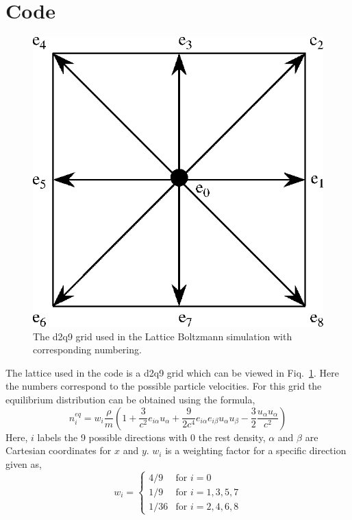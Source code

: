 \documentclass[8pt,twocolumn]{article}
\begin{document}
\section*{Code}
\begin{figure}[!b]
\centering
\includegraphics[width=0.8\linewidth]{images/d2q9.png}
\caption{The d2q9 grid used in the Lattice Boltzmann simulation with corresponding numbering.}
\label{fig:d2q9}
\end{figure}
The lattice used in the code is a d2q9 grid which can be viewed in Fiq.~\ref{fig:d2q9}. Here the numbers correspond to the possible particle velocities. For this grid the equilibrium distribution can be obtained using the formula,
\begin{equation}
n^{eq}_i = w_i \frac{\rho}{m} \left(1 + \frac{3}{c^2} e_{i\alpha}u_{\alpha} + \frac{9}{2c^4} e_{i\alpha}e_{i\beta}u_{\alpha}u_{\beta} - \frac{3}{2} \frac{u_{\alpha}u_{\alpha}}{c^2} \right)
\label{eq:neq}
\end{equation}
Here, $i$ labels the 9 possible directions with 0 the rest density, $\alpha$ and $\beta$ are Cartesian coordinates for $x$ and $y$. $w_i$ is a weighting factor for a specific direction given as,
\begin{equation}
w_i = 
  \begin{cases}
  4/9 & \text{for } i = 0 \\
  1/9 & \text{for } i = 1,3,5,7 \\
  1/36 & \text{for } i = 2,4,6,8
  \end{cases}
\label{eq:wi}
\end{equation}
\end{document}

